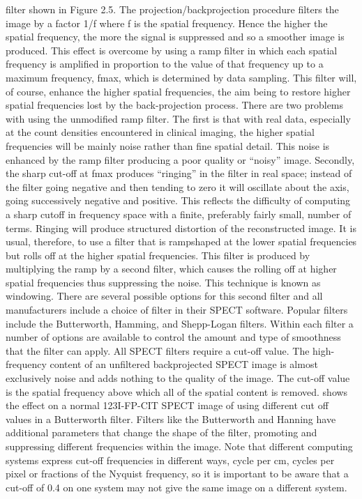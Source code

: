 \documentclass[12pt]{article}
\begin{document}
filter shown in Figure 2.5. The projection/backprojection procedure filters the image by a factor 1/f where f is the spatial frequency. Hence the higher the spatial frequency, the more the signal is suppressed and so a smoother image is produced.
This effect is overcome by using a ramp filter in which each spatial frequency is amplified in proportion to the value of that frequency up to
a maximum frequency, fmax, which is determined by data sampling. This filter will, of course, enhance the higher spatial frequencies, the aim being to restore higher spatial frequencies lost by the back-projection process. There are two problems with using the unmodified ramp filter. The first is that with real data, especially at the count densities encountered in clinical imaging, the higher spatial frequencies will be mainly noise rather than fine spatial detail. This noise is enhanced by the ramp filter producing a poor quality or “noisy” image. Secondly, the sharp cut-off at fmax produces “ringing” in the filter in real space; instead of the filter going negative and then tending to
zero it will oscillate about the axis, going successively negative and positive. This reflects the difficulty of computing a sharp cutoff in frequency space with a finite, preferably fairly small, number of terms. Ringing will produce structured distortion of the reconstructed image.
It is usual, therefore, to use a filter that is rampshaped at the lower spatial frequencies but rolls off at the higher spatial frequencies. This filter is produced by multiplying the ramp by a second filter, which causes the rolling off at higher spatial frequencies thus suppressing the noise. This technique is known as windowing. There are several possible options for this second filter and all manufacturers include a choice of filter in their SPECT
software. Popular filters include the Butterworth, Hamming, and Shepp-Logan filters. Within each filter a number of options are available to control
the amount and type of smoothness that the filter can apply. All SPECT filters require a cut-off value. The high-frequency content of an unfiltered backprojected SPECT image is almost exclusively noise and adds nothing to the quality of the image. The cut-off value is the spatial frequency above which all of the spatial content is removed. shows the effect on a normal 123I-FP-CIT SPECT image of using different cut off values in a Butterworth filter. Filters like the Butterworth and Hanning have additional parameters that change the shape of the filter, promoting and suppressing different frequencies within the image. Note that different computing systems express cut-off frequencies in different ways, cycle per cm, cycles per pixel or fractions of the Nyquist frequency, so it is important to be aware that a cut-off of 0.4 on one system may not give the same image on a different
system.
\end{document}
